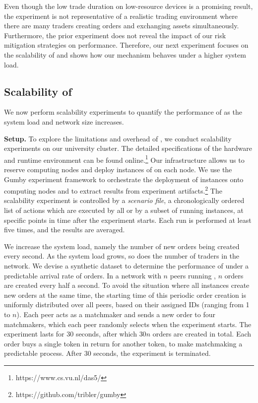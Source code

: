 Even though the low trade duration on low-resource devices is a promising result, the experiment is not representative of a realistic trading environment where there are many traders creating orders and exchanging assets simultaneously.
Furthermore, the prior experiment does not reveal the impact of our risk mitigation strategies on performance.
Therefore, our next experiment focuses on the scalability of \ModelName{} and shows how our mechanism behaves under a higher system load.

\subsection{Scalability of \ModelName{}}
\label{subsec:scalability_experiment}
We now perform scalability experiments to quantify the performance of \ModelName{} as the system load and network size increases.

\textbf{Setup.}
To explore the limitations and overhead of \ModelName{}, we conduct scalability experiments on our university cluster.
The detailed specifications of the hardware and runtime environment can be found online.\footnote{https://www.cs.vu.nl/das5/}
Our infrastructure allows us to reserve computing nodes and deploy instances of \ModelName{} on each node.
We use the Gumby experiment framework to orchestrate the deployment of \ModelName{} instances onto computing nodes and to extract results from experiment artifacts.\footnote{https://github.com/tribler/gumby}
The scalability experiment is controlled by a \emph{scenario file}, a chronologically ordered list of actions which are executed by all or by a subset of running instances, at specific points in time after the experiment starts.
Each run is performed at least five times, and the results are averaged.

We increase the system load, namely the number of new orders being created every second.
As the system load grows, so does the number of traders in the network.
We devise a synthetic dataset to determine the performance of \ModelName{} under a predictable arrival rate of orders.
In a network with $ n $ peers running \ModelName{}, $ n $ orders are created every half a second.
To avoid the situation where all instances create new orders at the same time, the starting time of this periodic order creation is uniformly distributed over all peers, based on their assigned IDs (ranging from 1 to $ n $).
Each peer acts as a matchmaker and sends a new order to four matchmakers, which each peer randomly selects when the experiment starts.
The experiment lasts for 30 seconds, after which $ 30n $ orders are created in total.
Each order buys a single token in return for another token, to make matchmaking a predictable process.
After 30 seconds, the experiment is terminated.


